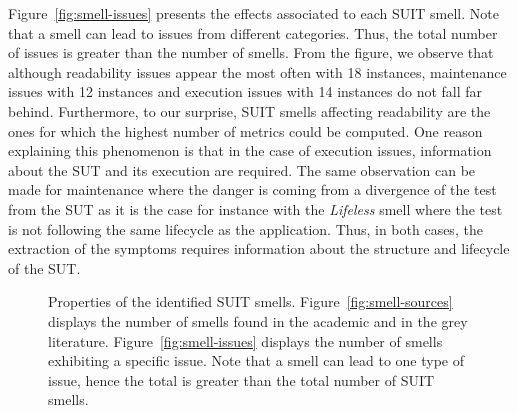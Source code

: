 Figure~\ref{fig:smell-issues} presents the effects associated to each SUIT smell. Note that a smell can lead to issues from different categories. Thus, the total number of issues is greater than the number of smells. From the figure, we observe that although readability issues appear the most often with 18 instances, maintenance issues with 12 instances and execution issues with 14 instances do not fall far behind. Furthermore, to our surprise, SUIT smells affecting readability are the ones for which the highest number of metrics could be computed. One reason explaining this phenomenon is that in the case of execution issues, information about the SUT and its execution are required. The same observation can be made for maintenance where the danger is coming from a divergence of the test from the SUT as it is the case for instance with the \emph{Lifeless} smell \cite{Buwalda2015, Renaudin2016, Buwalda2019} where the test is not following the same lifecycle as the application. Thus, in both cases, the extraction of the symptoms requires information about the structure and lifecycle of the SUT.

\begin{figure}
\centering
{}
\caption{Properties of the identified SUIT smells. Figure~\ref{fig:smell-sources} displays the number of smells found in the academic and in the grey literature. Figure~\ref{fig:smell-issues} displays the number of smells exhibiting a specific issue. Note that a smell can lead to one type of issue, hence the total is greater than the total number of SUIT smells.}  
\label{fig:smells}
\end{figure}

